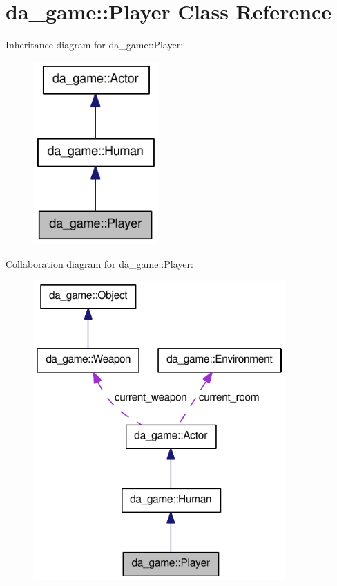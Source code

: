 \hypertarget{classda__game_1_1Player}{
\section{da\_\-game::Player Class Reference}
\label{classda__game_1_1Player}
}
Inheritance diagram for da\_\-game::Player:\nopagebreak
\begin{figure}[H]
\begin{center}
\leavevmode
\includegraphics[width=136pt]{classda__game_1_1Player__inherit__graph}
\end{center}
\end{figure}
Collaboration diagram for da\_\-game::Player:\nopagebreak
\begin{figure}[H]
\begin{center}
\leavevmode
\includegraphics[width=274pt]{classda__game_1_1Player__coll__graph}
\end{center}
\end{figure}

